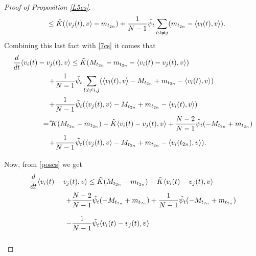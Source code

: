 \documentclass[a4paper,11pt,oneside]{article}
\begin{document}
\begin{proof}[Proof of Proposition \ref{L5cs}]
$$\begin{array}{l}
		\displaystyle{\hspace{0.4 cm}\leq \tilde K(\langle v_{j}(t),v\rangle-m_{t_{2n}})+\frac{1}{N-1}\tilde\psi_{t}\sum_{l:l\neq j}(m_{t_{2n}}-\langle v_{l}(t),v\rangle).}
	\end{array}
	$$
	Combining this last fact with \eqref{7cs} it comes that 
	$$\begin{array}{l}
		\vspace{0.2cm}\displaystyle{\frac{d}{dt}\langle v_{i}(t)-v_{j}(t),v\rangle\leq \tilde K(M_{t_{2n}}-m_{t_{2n}}-\langle v_{i}(t)-v_{j}(t),v\rangle)}\\
		\vspace{0.2cm}\displaystyle{\hspace{1.8 cm}+\frac{1}{N-1}\tilde\psi_{t}\sum_{l:l\neq i,j}(\langle v_{l}(t),v\rangle-M_{t_{2n}}+m_{t_{2n}}-\langle v_{l}(t),v\rangle)}\\
		\vspace{0.2cm}\displaystyle{\hspace{1.8 cm}+\frac{1}{N-1}\tilde\psi_{t}(\langle v_{j}(t),v\rangle-M_{t_{2n}}+m_{t_{2n}}-\langle v_{i}(t),v\rangle)}\\
		\vspace{0.2cm}\displaystyle{\hspace{1.5 cm}=\tilde \tilde K(M_{t_{2n}}-m_{t_{2n}})-\tilde K\langle v_{i}(t)-v_{j}(t),v\rangle+\frac{N-2}{N-1}\tilde\psi_{t}(-M_{t_{2n}}+m_{t_{2n}})}\\
		\vspace{0.2cm}\displaystyle{\hspace{1.8 cm}+\frac{1}{N-1}\tilde\psi_{t}(\langle v_{j}(t),v\rangle-M_{t_{2n}}+m_{t_{2n}}-\langle v_{i}(t_{2n}),v\rangle)}.
	\end{array}
	$$
	Now, from \eqref{poscs} we get
	$$\begin{array}{l}
		\vspace{0.2cm}\displaystyle{
			\frac{d}{dt}\langle v_{i}(t)-v_{j}(t),v\rangle\leq \tilde K(M_{t_{2n}}-m_{t_{2n}})-\tilde K\langle v_{i}(t)-v_{j}(t),v\rangle
		}\\
		\vspace{0.4 cm}\displaystyle{\hspace{1.8 cm}
			+\frac{N-2}{N-1}\tilde\psi_{t}(-M_{t_{2n}}+m_{t_{2n}})+\frac{1}{N-1}\tilde\psi_{t}(-M_{t_{2n}}+m_{t_{2n}})
		}\\
		\vspace{0.4 cm}\displaystyle{\hspace{1.8 cm}
			-\frac{1}{N-1}\tilde\psi_{t}\langle v_{i}(t)-v_{j}(t),v\rangle
		}\\

\end{array}$$
\end{proof}
\end{document}
